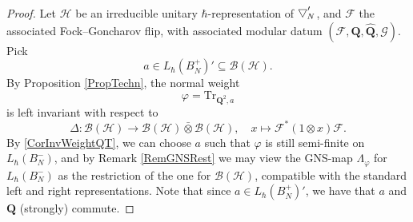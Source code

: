 \documentclass[11pt, reqno]{amsart}
\theoremstyle{definition}
\numberwithin{equation}{section}
\newcommand{\Hsp}{\mathcal{H}}
\newcommand{\Bc}{\mathcal{B}}
\newcommand{\Qb}{\mathbf{Q}}
\newcommand{\Fct}{\mathcal{F}}
\newcommand{\tFct}{\mathcal{G}}
\newcommand{\Bor}{B}
\newcommand{\wbtd}[1]{\raisebox{\depth}{$\bigtriangledown'$\!\!}_{#1}}
\newcommand{\Tr}{\mathrm{Tr}}
\begin{document}
\begin{proof}
Let $\Hsp$ be an irreducible unitary $\hbar$-representation of $\wbtd{N}$, and $\Fct$ the associated Fock--Goncharov flip, with associated modular datum $(\Fct,\Qb,\hat{\Qb},\tFct)$. Pick 
\[
a\in L_{\hbar}(\Bor_N^+)' \subseteq \Bc(\Hsp).
\]
By Proposition \ref{PropTechn}, the normal weight 
\[
\varphi = \Tr_{\Qb^2,a}
\]
is left invariant with respect to 
\[
\Delta\colon  \Bc(\Hsp) \rightarrow \Bc(\Hsp) \bar{\otimes}\Bc(\Hsp),\quad x \mapsto \Fct^*(1\otimes x)\Fct.
\]
By \eqref{CorInvWeightQT}, we can choose $a$ such that $\varphi$ is still semi-finite on $L_{\hbar}(\Bor_N^-)$, and by Remark \ref{RemGNSRest} we may view the GNS-map $\Lambda_{\varphi}$ for $L_{\hbar}(\Bor_N^-)$ as the restriction of the one for $\Bc(\Hsp)$, compatible with the standard left and right representations. Note that since $a\in L_{\hbar}(\Bor_N^+)'$, we have that $a$ and $\Qb$ (strongly) commute.


\end{proof}
\end{document}
